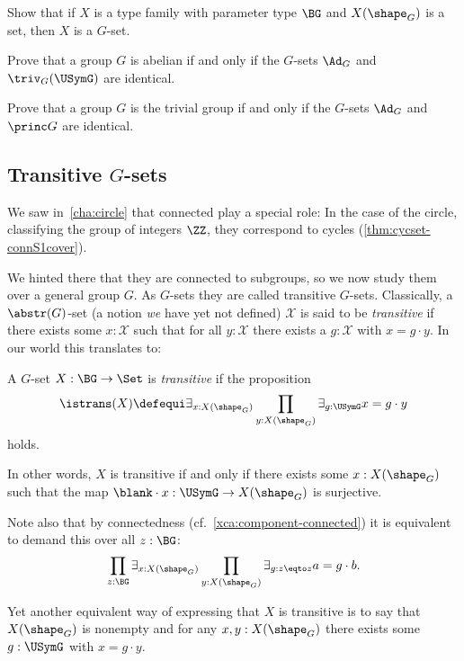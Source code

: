 \begin{xca}
Show that if $X$ is a type family with parameter type $\BG$ and $X(\shape_G)$ is a set,
then $X$ is a $G$-set.
\end{xca}

\begin{xca}\label{xca:Ad-triv-abelian}
  Prove that a group $G$ is abelian if and only if the $G$-sets $\Ad_G$ and
  $\triv_G(\USymG)$ are identical.
\end{xca}

\begin{xca}\label{xca:Ad-princ-trivial}
  Prove that a group $G$ is the trivial group if and only if the $G$-sets $\Ad_G$ and
  $\princ G$ are identical.
\end{xca}

\subsection{Transitive $G$-sets}
\label{sec:transitiveGsets}
We saw in~\cref{cha:circle} that connected \coverings play a special role:
In the case of the circle, classifying the group of integers $\ZZ$,
they correspond to cycles (\cref{thm:cycset-connS1cover}).

We hinted there that they are connected to subgroups, so
we now study them over a general group $G$.
As $G$-sets they are called transitive $G$-sets.
Classically, a $\abstr(G)$-set (a notion \emph{we} have yet not defined) $\mathcal X$ is said to be \emph{transitive} if there exists some $x:\mathcal X$ such that for all $y:\mathcal X$ there exists a $g:\mathcal X$ with $x=g\cdot y$.  In our world this translates to:
\begin{definition}\label{def:transitiveGset}
  A $G$-set $X:\BG\to\Set$ is \emph{transitive} if the proposition
  \[
    \istrans(X) \defequi
    \exists_{x:X(\shape_G)} \prod_{y:X(\shape_G)} \exists_{g:\USymG} x=g\cdot y
  \]
  holds.
\end{definition}
\begin{remark}
  In other words, $X$ is transitive if and only if there exists
  some $x:X(\shape_G)$ such that the map $\blank\cdot x:\USymG\to X(\shape_G)$ is
  surjective.

  Note also that by connectedness (cf.~\cref{xca:component-connected})
  it is equivalent to demand this over all $z:\BG$:
  \begin{equation}\label{eq:Gset-trans-gen}
    \prod_{z:\BG}\exists_{x:X(\shape_G)}
    \prod_{y:X(\shape_G)}\exists_{g:z\eqto z}a=g\cdot b.
  \end{equation}

  Yet another equivalent way of expressing that $X$ is transitive is to say
  that $X(\shape_G)$ is nonempty and for any $x,y:X(\shape_G)$ there
  exists some $g:\USymG$ with $x = g\cdot y$.
\end{remark}

